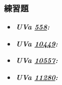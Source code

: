 \subsubsection*{練習題}
\begin{itemize}[label={\Checkmark}]
\item \textbf{\textit{UVa \href{http://uva.onlinejudge.org/external/5/558.html}{558}: }}\\

\item \textbf{\textit{UVa \href{http://uva.onlinejudge.org/external/104/10449.html}{10449}: }}\\

\item \textbf{\textit{UVa \href{http://uva.onlinejudge.org/external/105/10557.html}{10557}: }}\\

\item \textbf{\textit{UVa \href{http://uva.onlinejudge.org/external/112/11280.html}{11280}: }}\\

\end{itemize}